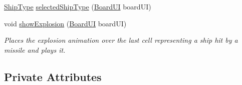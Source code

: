 \begin{DoxyCompactItemize}
\hyperlink{enumbattleship2D_1_1model_1_1ShipType}{Ship\-Type} \hyperlink{classbattleship2D_1_1ui_1_1MainFrame_a78551c236b4bf69570890f531173ea16}{selected\-Ship\-Type} (\hyperlink{classbattleship2D_1_1ui_1_1BoardUI}{Board\-U\-I} board\-U\-I)
\item 
void \hyperlink{classbattleship2D_1_1ui_1_1MainFrame_a5868b473495cb0b1f2219257649900f2}{show\-Explosion} (\hyperlink{classbattleship2D_1_1ui_1_1BoardUI}{Board\-U\-I} board\-U\-I)
\begin{DoxyCompactList}\small\item\em Places the explosion animation over the last cell representing a ship hit by a missile and plays it. \end{DoxyCompactList}\end{DoxyCompactItemize}
\subsection*{Private Attributes}
